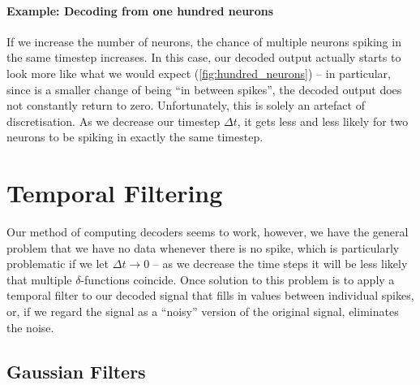\documentclass[10pt,letterpaper,oneside]{article}
\begin{document}
\paragraph{Example: Decoding from one hundred neurons}
If we increase the number of neurons, the chance of multiple neurons spiking in the same timestep increases. In this case, our decoded output actually starts to look more like what we would expect (\cref{fig:hundred_neurons}) -- in particular, since is a smaller change of being \enquote{in between spikes}, the decoded output does not constantly return to zero. Unfortunately, this is solely an artefact of discretisation. As we decrease our timestep $\Delta t$, it gets less and less likely for two neurons to be spiking in exactly the same timestep.


\section{Temporal Filtering}

Our method of computing decoders seems to work, however, we have the general problem that we have no data whenever there is no spike, which is particularly problematic if we let $\Delta t \to 0$ -- as we decrease the time steps it will be less likely that multiple $\delta$-functions coincide. Once solution to this problem is to apply a temporal filter to our decoded signal that fills in values between individual spikes, or, if we regard the signal as a \enquote{noisy} version of the original signal, eliminates the noise.

\subsection{Gaussian Filters}
\end{document}
